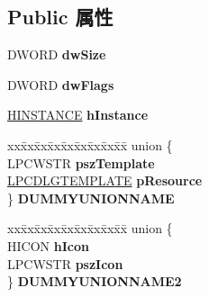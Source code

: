 \subsection*{Public 属性}
\begin{DoxyCompactItemize}
\item 
\mbox{\label{struct___p_r_o_p_s_h_e_e_t_p_a_g_e_w_a590a53c64e22e2356fa93d7a4f4840da}} 
D\+W\+O\+RD {\bfseries dw\+Size}
\item 
\mbox{\label{struct___p_r_o_p_s_h_e_e_t_p_a_g_e_w_a63f54c7aad8f0d13291805365d589b36}} 
D\+W\+O\+RD {\bfseries dw\+Flags}
\item 
\mbox{\label{struct___p_r_o_p_s_h_e_e_t_p_a_g_e_w_afafd1e845b261d7368dd63bde33255b0}} 
\hyperlink{interfacevoid}{H\+I\+N\+S\+T\+A\+N\+CE} {\bfseries h\+Instance}
\item 
\mbox{\label{struct___p_r_o_p_s_h_e_e_t_p_a_g_e_w_ad8ac3013c5ed7c87241c2d0c6cf4fc2e}} 
\begin{tabbing}
xx\=xx\=xx\=xx\=xx\=xx\=xx\=xx\=xx\=\kill
union \{\\
\>LPCWSTR {\bfseries pszTemplate}\\
\>\hyperlink{struct_d_l_g_t_e_m_p_l_a_t_e}{LPCDLGTEMPLATE} {\bfseries pResource}\\
\} {\bfseries DUMMYUNIONNAME}\\

\end{tabbing}\item 
\mbox{\label{struct___p_r_o_p_s_h_e_e_t_p_a_g_e_w_a71fd19ff90c7b07651e0f176988b6160}} 
\begin{tabbing}
xx\=xx\=xx\=xx\=xx\=xx\=xx\=xx\=xx\=\kill
union \{\\
\>HICON {\bfseries hIcon}\\
\>LPCWSTR {\bfseries pszIcon}\\
\} {\bfseries DUMMYUNIONNAME2}\\


\end{tabbing}
\end{DoxyCompactItemize}
